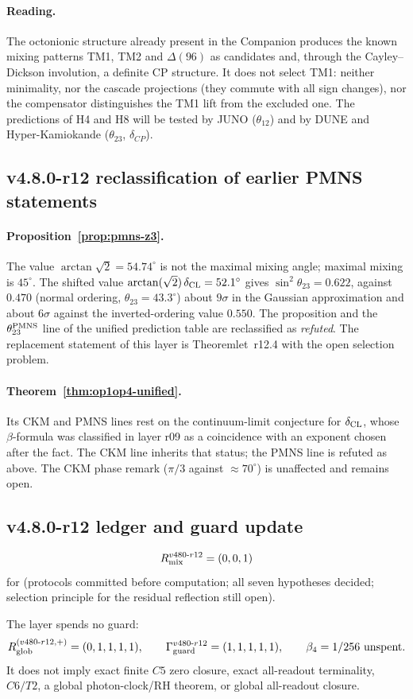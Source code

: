\paragraph{Reading.}
The octonionic structure already present in the Companion produces the known mixing patterns TM1, TM2
and \(\Delta(96)\) as candidates and, through the Cayley--Dickson involution, a definite CP structure.  It
does not select TM1: neither minimality, nor the cascade projections (they commute with all sign changes),
nor the compensator distinguishes the TM1 lift from the excluded one.  The predictions of H4 and H8 will be
tested by JUNO (\(\theta_{12}\)) and by DUNE and Hyper-Kamiokande (\(\theta_{23}\), \(\delta_{CP}\)).

\subsection*{v4.8.0-r12 reclassification of earlier PMNS statements}
\label{subsec:v480-r12-reclassification}

\paragraph{Proposition~\ref{prop:pmns-z3}.}
The value \(\arctan\sqrt2=54.74^\circ\) is not the maximal mixing angle; maximal mixing is \(45^\circ\).
The shifted value \(\arctan(\sqrt2)\,\delta_{\rm CL}=52.1^\circ\) gives \(\sin^2\theta_{23}=0.622\), against
\(0.470\) (normal ordering, \(\theta_{23}=43.3^\circ\)) about \(9\sigma\) in the Gaussian approximation and
about \(6\sigma\) against the inverted-ordering value \(0.550\).  The proposition and the
\(\theta_{23}^{\rm PMNS}\) line of the unified prediction table are reclassified as \emph{refuted}.  The
replacement statement of this layer is Theoremlet~r12.4 with the open selection problem.

\paragraph{Theorem~\ref{thm:op1op4-unified}.}
Its CKM and PMNS lines rest on the continuum-limit conjecture for \(\delta_{\rm CL}\), whose \(\beta\)-formula
was classified in layer r09 as a coincidence with an exponent chosen after the fact.  The CKM line inherits
that status; the PMNS line is refuted as above.  The CKM phase remark (\(\pi/3\) against \(\approx70^\circ\))
is unaffected and remains open.

\subsection*{v4.8.0-r12 ledger and guard update}
\label{subsec:v480-r12-ledger-guard}

\[
R_{\rm mix}^{v480\text{-}r12}=(0,0,1)
\]
for (protocols committed before computation; all seven hypotheses decided; selection principle for the
residual reflection still open).

The layer spends no guard:
\[
R_{\rm glob}^{(v480\text{-}r12,+)}=(0,1,1,1,1),
\qquad
\Gamma_{\rm guard}^{v480\text{-}r12}=(1,1,1,1,1),
\qquad
\beta_4=1/256\ \text{unspent}.
\]
It does not imply exact finite \(C5\) zero closure, exact all-readout terminality,
\(C6/T2\), a global photon-clock/RH theorem, or global all-readout closure.
